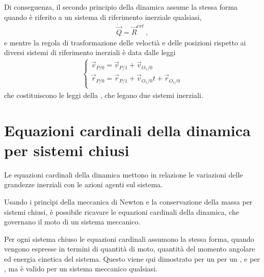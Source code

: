 \documentclass[letterpaper,10pt,italian]{jupyterBook}
\begin{document}
\sphinxAtStartPar
Di conseguenza, il secondo principio della dinamica assume la stessa forma quando è riferito a un sistema di riferimento inerziale qualsiasi,
\begin{equation*}
\begin{split}\dot{\vec{Q}} = \vec{R}^{ext} \ ,\end{split}
\end{equation*}
\sphinxAtStartPar
e mentre la regola di trasformazione delle veloctià e delle posizioni rispetto ai diversi sistemi di riferimento inerziali è data dalle leggi
\begin{equation*}
\begin{split}\begin{cases}
  \vec{v}_{P/0} = \vec{v}_{P/1} + \vec{v}_{O_1/0} \\
  \vec{r}_{P/0} = \vec{r}_{P/1} + \vec{v}_{O_1/0} t + \vec{r}_{O_1/0} \\
\end{cases}\end{split}
\end{equation*}
\sphinxAtStartPar
che costituiscono le leggi della , che legano due sistemi inerziali.

\sphinxstepscope


\section{Equazioni cardinali della dinamica per sistemi chiusi}
\label{\detokenize{ch/mechanics/dynamics-eom:equazioni-cardinali-della-dinamica-per-sistemi-chiusi}}\label{\detokenize{ch/mechanics/dynamics-eom:physics-hs-mechanics-dynamics-eom}}\label{\detokenize{ch/mechanics/dynamics-eom::doc}}
\sphinxAtStartPar
Le equazioni cardinali della dinamica mettono in relazione le variazioni delle grandezze inerziali con le azioni agenti sul sistema.

\sphinxAtStartPar
Usando i princìpi della meccanica di Newton e la conservazione della massa per sistemi chiusi, è possibile ricavare le equazioni cardinali della dinamica, che governano il moto di un sistema meccanico.

\sphinxAtStartPar
Per ogni sistema chiuso le equazioni cardinali assumono la stessa forma, quando vengono espresse in termini di quantità di moto, quantità del momento angolare ed energia cinetica del sistema. Questo viene qui dimostrato per un {\hyperref[\detokenize{ch/mechanics/dynamics-eom-proof-points:physics-hs-mechanics-dynamics-eom-points}]{}} per un {\hyperref[\detokenize{ch/mechanics/dynamics-eom-proof-points:physics-hs-mechanics-dynamics-eom-points}]{}}, e per {\hyperref[\detokenize{ch/mechanics/dynamics-eom-proof-rigid-2d:physics-hs-mechanics-dynamics-eom-rigid-2d}]{}} , ma è valido per un sistema meccanico qualsiasi.
\end{document}
